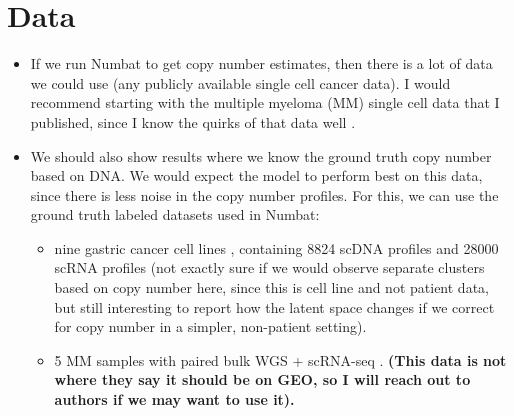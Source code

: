 \documentclass{article}
\begin{document}
\section{Data}
    \begin{itemize}
        \item If we run Numbat to get copy number estimates, then there is a lot of data we could use (any publicly available single cell cancer data). I would recommend starting with the multiple myeloma (MM) single cell data that I published, since I know the quirks of that data well \citep{boiarsky2022single}.
        \item We should also show results where we know the ground truth copy number based on DNA. We would expect the model to perform best on this data, since there is less noise in the copy number profiles. For this, we can use the ground truth labeled datasets used in Numbat:
        \begin{itemize}
            \item nine gastric cancer cell lines \citep{andor2020joint}, containing 8824 scDNA profiles and 28000 scRNA profiles (not exactly sure if we would observe separate clusters based on copy number here, since this is cell line and not patient data, but still interesting to report how the latent space changes if we correct for copy number in a simpler, non-patient setting).
            \item 5 MM samples with paired bulk WGS + scRNA-seq \citep{liu2021co}. \textbf{(This data is not where they say it should be on GEO, so I will reach out to authors if we may want to use it).}
        \end{itemize}
    \end{itemize}
\end{document}
